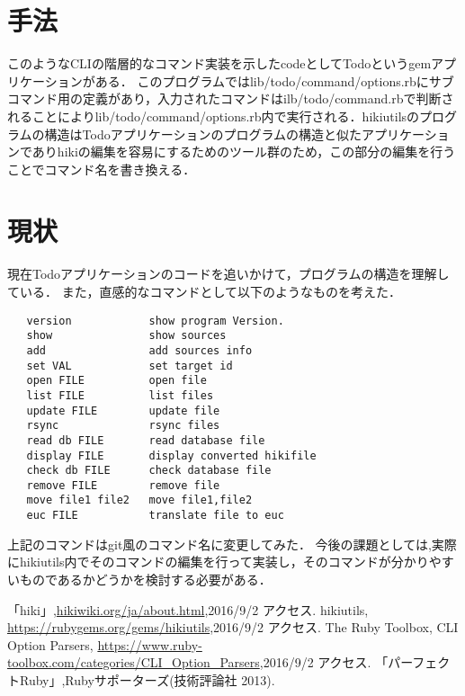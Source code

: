 \documentclass[a4j,twocolumn]{jsarticle}
\begin{document}
\section{手法}
このようなCLIの階層的なコマンド実装を示したcodeとしてTodoというgemアプリケーションがある\cite{PerfectRuby}．
このプログラムではlib/todo/command/options.rbにサブコマンド用の定義があり，入力されたコマンドはilb/todo/command.rbで判断されることによりlib/todo/command/options.rb内で実行される．hikiutilsのプログラムの構造はTodoアプリケーションのプログラムの構造と似たアプリケーションでありhikiの編集を容易にするためのツール群のため，この部分の編集を行うことでコマンド名を書き換える．

\section{現状}
現在Todoアプリケーションのコードを追いかけて，プログラムの構造を理解している．
また，直感的なコマンドとして以下のようなものを考えた．
\begin{verbatim}
   version            show program Version.
   show               show sources
   add                add sources info
   set VAL            set target id
   open FILE          open file
   list FILE          list files
   update FILE        update file
   rsync              rsync files
   read db FILE       read database file
   display FILE       display converted hikifile
   check db FILE      check database file
   remove FILE        remove file
   move file1 file2   move file1,file2
   euc FILE           translate file to euc
\end{verbatim}
上記のコマンドはgit風のコマンド名に変更してみた．
今後の課題としては,実際にhikiutils内でそのコマンドの編集を行って実装し，そのコマンドが分かりやすいものであるかどうかを検討する必要がある．

\begin{thebibliography}{9}
「hiki」,\url{hikiwiki.org/ja/about.html},2016/9/2 アクセス.
 hikiutils, \url{https://rubygems.org/gems/hikiutils},2016/9/2 アクセス.
 The Ruby Toolbox, CLI Option Parsers, \url{https://www.ruby-toolbox.com/categories/CLI_Option_Parsers},2016/9/2 アクセス.
「パーフェクトRuby」,Rubyサポーターズ(技術評論社 2013).
\end{thebibliography}
\end{document}
